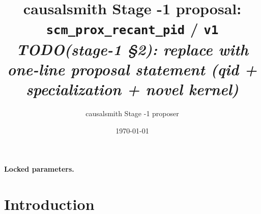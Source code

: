 \documentclass[11pt]{article}
\title{causalsmith Stage -1 proposal: \texttt{scm\_prox\_recant\_pid} / \texttt{v1}%
  \\ \large\textit{TODO(stage-1 \S2): replace with one-line proposal statement (qid + specialization + novel kernel)}}
\author{causalsmith Stage -1 proposer}
\date{\today}
\theoremstyle{definition}
\theoremstyle{plain}
\theoremstyle{remark}
\begin{document}
\maketitle


\paragraph{Locked parameters.}

\begin{abstract}
\end{abstract}

\section{Introduction}
%
%
%
%
\end{document}
